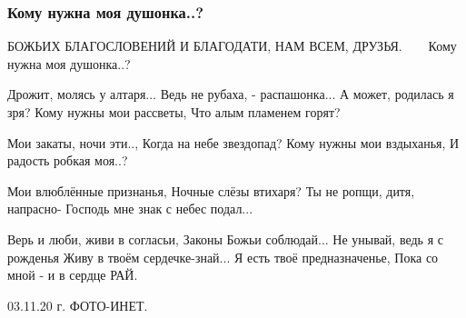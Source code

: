  
 
 

\subsubsection{Кому нужна моя душонка..?}

БОЖЬИХ БЛАГОСЛОВЕНИЙ И БЛАГОДАТИ,
НАМ ВСЕМ, ДРУЗЬЯ. 🙏🙏🙏🙏🙏
Кому нужна моя душонка..?

Дрожит, молясь у алтаря...
Ведь не рубаха, - распашонка...
А может, родилась я зря?
Кому нужны мои рассветы,
Что алым пламенем горят?

Мои закаты, ночи эти..,
Когда на небе звездопад?
Кому нужны мои вздыханья,
И радость робкая моя..?

Мои влюблённые признанья,
Ночные слёзы втихаря?
Ты не ропщи, дитя, напрасно-
Господь мне знак с небес подал...

Верь и люби, живи в согласьи,
Законы Божьи соблюдай...
Не унывай, ведь я с рожденья
Живу в твоём сердечке-знай...
Я есть твоё предназначенье,
Пока со мной - и в сердце РАЙ.

03.11.20 г.
ФОТО-ИНЕТ.
